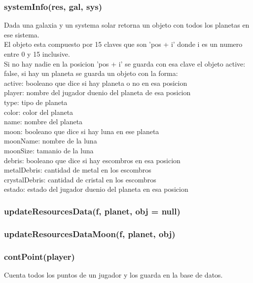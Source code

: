 \documentclass{article}
\newcommand\tab[1][1cm]{\hspace*{#1}}
\begin{document}
        \subsubsection{systemInfo(res, gal, sys)}
            Dada una galaxia y un systema solar retorna un objeto con todos los planetas en ese sistema.\\
            El objeto esta compuesto por 15 claves que son 'pos + i' donde i es un numero entre 0 y 15 inclusive.\\
            Si no hay nadie en la posicion 'pos + i' se guarda con esa clave el objeto {active: false}, si hay un planeta se guarda un objeto con la forma:\\
            \tab active: booleano que dice si hay planeta o no en esa posicion\\
            \tab player: nombre del jugador duenio del planeta de esa posicion\\
            \tab type: tipo de planeta\\
            \tab color: color del planeta\\
            \tab name: nombre del planeta\\
            \tab moon: booleano que dice si hay luna en ese planeta\\
            \tab moonName: nombre de la luna\\
            \tab moonSize: tamanio de la luna\\
            \tab debris: booleano que dice si hay escombros en esa posicion\\
            \tab metalDebris: cantidad de metal en los escombros\\
            \tab crystalDebris: cantidad de cristal en los escombros\\
            \tab estado: estado del jugador duenio del planeta en esa posicion\\
        \subsubsection{updateResourcesData(f, planet, obj = null)}
        \subsubsection{updateResourcesDataMoon(f, planet, obj)}
        \subsubsection{contPoint(player)}
          Cuenta todos los puntos de un jugador y los guarda en la base de datos.
\end{document}
